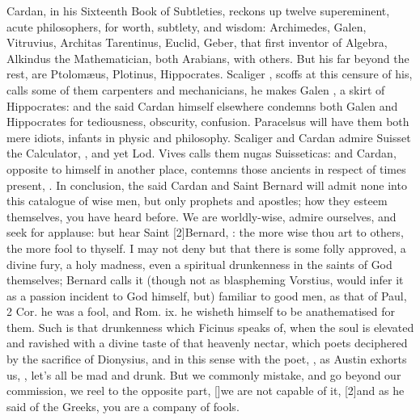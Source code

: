 {Cardan, in his Sixteenth Book of Subtleties, reckons up twelve
supereminent, acute philosophers, for worth, subtlety, and wisdom:
Archimedes, Galen, Vitruvius, Architas Tarentinus, Euclid, Geber, that
first inventor of Algebra, Alkindus the Mathematician, both Arabians,
with others. But his  far beyond the rest, are
Ptolom\ae{}us, Plotinus, Hippocrates. Scaliger , scoffs at
this censure of his, calls some of them carpenters and mechanicians, he
makes Galen , a skirt of Hippocrates: and the said
Cardan himself elsewhere condemns both Galen and Hippocrates for
tediousness, obscurity, confusion. Paracelsus will have them both mere
idiots, infants in physic and philosophy. Scaliger and Cardan admire
Suisset the Calculator, , and yet
Lod. Vives calls them nugas Suisseticas: and Cardan, opposite to
himself in another place, contemns those ancients in respect of times
present, . In conclusion, the said Cardan and Saint Bernard will
admit none into this catalogue of wise men, but only prophets and
apostles; how they esteem themselves, you have heard before. We are
worldly-wise, admire ourselves, and seek for applause: but hear Saint
[2\baselineskip]Bernard, : the more
wise thou art to others, the more fool to thyself. I may not deny but
that there is some folly approved, a divine fury, a holy madness, even
a spiritual drunkenness in the saints of God themselves;  Bernard calls it (though not as blaspheming Vorstius,
would infer it as a passion incident to God himself, but) familiar to
good men, as that of Paul, 2 Cor. he was a fool, \etc{} and Rom. ix. he
wisheth himself to be anathematised for them. Such is that drunkenness
which Ficinus speaks of, when the soul is elevated and ravished with a
divine taste of that heavenly nectar, which poets deciphered by the
sacrifice of Dionysius, and in this sense with the poet, , as Austin exhorts us, , let's all
be mad and drunk. But we commonly mistake, and go beyond our
commission, we reel to the opposite part, [\baselineskip]we are not capable of
it, [2\baselineskip]and as he said of the Greeks,  you are a company of fools.

}
